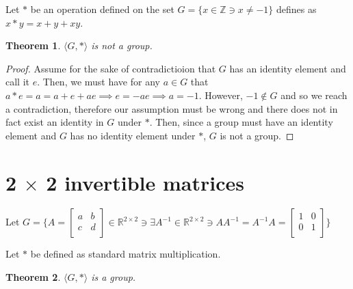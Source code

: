 \documentclass[12pt]{article}
\newcommand{\reals}{\mathbb{R}}
\newcommand{\ints}{\mathbb{Z}}
\newtheorem{thm}{Theorem}
\begin{document}
Let $*$ be an operation defined on the set $G = \{ x \in \ints \ni x \neq -1 \}$ defines as $x * y = x + y + xy$.

\begin{thm} \label{thm:6}
	$\langle G, * \rangle$ is not a group.
\end{thm}

\begin{proof}
	Assume for the sake of contradictioion that $G$ has an identity element and call it $e$.
	Then, we must have for any $a \in G$ that $a * e = a = a + e + ae \implies e = -ae \implies a = -1$.
	However, $-1 \not\in G$ and so we reach a contradiction,
	therefore our assumption must be wrong and there does not in fact exist an identity in $G$ under $*$.
	Then, since a group must have an identity element and $G$ has no identity element under $*$, $G$ is not a group.
\end{proof}

\section{2 $\times$ 2 invertible matrices}

Let $G = \{A = \begin{bmatrix} a & b \\ c & d \\ \end{bmatrix} \in \reals^{2 \times 2} \ni \exists A^{-1} \in \reals^{2 \times 2} \ni AA^{-1} = A^{-1}A = \begin{bmatrix} 1 & 0 \\ 0 & 1 \\ \end{bmatrix} \}$

\noindent Let $*$ be defined as standard matrix multiplication.

\begin{thm} \label{thm:7}
	$\langle G,* \rangle$ is a group.
\end{thm}
\end{document}
